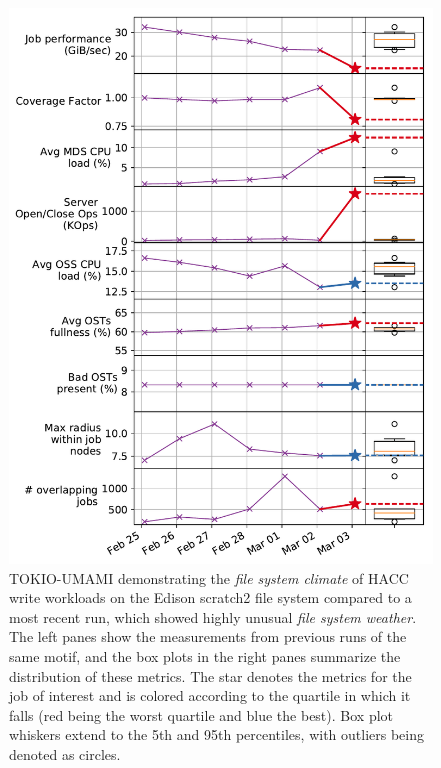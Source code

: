 \begin{figure}[t]
    \centering
    \includegraphics[width=1.0\columnwidth]{figs/umami-scratch2-hacc-write.pdf}
    \caption{TOKIO-UMAMI demonstrating the \emph{file system climate} of HACC write workloads on the Edison scratch2 file system compared to a most recent run, which showed highly unusual \emph{file system weather}. The left panes show the measurements from previous runs of the same motif, and the box plots in the right panes summarize the distribution of these metrics.  The star denotes the metrics for the job of interest and is colored according to the quartile in which it falls (red being the worst quartile and blue the best). Box plot whiskers extend to the 5th and 95th percentiles, with outliers being denoted as circles.}
    \label{fig:umami-scratch2-hacc-write}
\end{figure}

